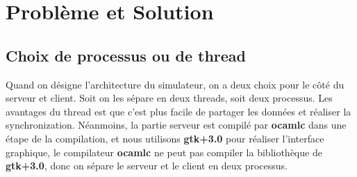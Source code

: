 \documentclass[14px]{article}
\begin{document}
\begin{enumerate}
\begin{figure}[htbp]
{\begin{minipage}[t]{0.3\linewidth}
			\end{minipage}%
		}%
		\centering
	\end{figure}

\end{enumerate}
\clearpage

\section{Problème et Solution}
\subsection{Choix de processus ou de thread}
Quand on désigne l'architecture du simulateur, on a deux choix pour le côté du serveur et client. Soit on les sépare en deux threads, soit deux processus. Les avantages du thread est que c'est plus facile de partager les données et réaliser la synchronization. Néanmoins, la partie serveur est compilé par \textbf{ocamlc} dans une étape de la compilation, et nous utilisons \textbf{gtk+3.0} pour réaliser l'interface graphique, le compilateur \textbf{ocamlc} ne peut pas compiler la bibliothèque de \textbf{gtk+3.0}, donc on sépare le serveur et le client en deux processus.
\end{document}
